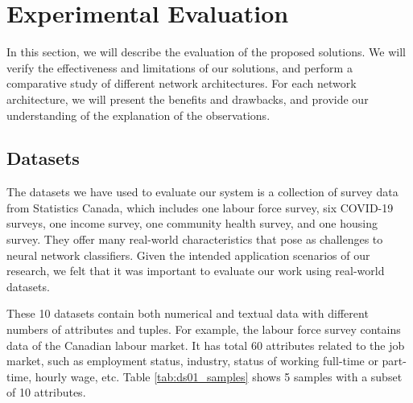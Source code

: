 \documentclass[conference]{IEEEtran}
\begin{document}
\section{Experimental Evaluation}

In this section, we will describe the evaluation of the proposed solutions.  We will verify the effectiveness and limitations of our solutions, and perform a comparative study of different network architectures.  For each network architecture, we will present the benefits and drawbacks, and provide our understanding of the explanation of the observations.

\subsection{Datasets}
The datasets we have used to evaluate our system is a collection of survey data from Statistics Canada, which includes one labour force survey, six COVID-19 surveys, one income survey, one community health survey, and one housing survey.
They offer many real-world characteristics that pose as challenges to  neural network classifiers.  Given the intended application scenarios of our research, we felt that it was important to evaluate our work using real-world datasets. 


These 10 datasets contain both numerical and textual data with different numbers of attributes and tuples. For example, the labour force survey contains data of the Canadian labour market. It has total 60 attributes related to the job market, such as employment status, industry, status of working full-time or part-time, hourly wage, etc. Table \ref{tab:ds01_samples} shows 5 samples with a subset of 10 attributes.
\end{document}
